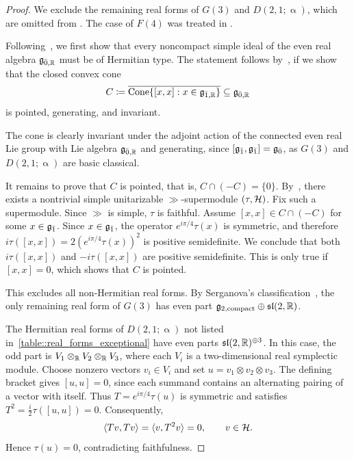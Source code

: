 \begin{proof}
We exclude the remaining real forms of $G(3)$ and
$D(2,1;\upalpha)$, which are omitted from
\cite[Theorem~6.2.1]{neeb2011lie}.
The case of $F(4)$ was treated in
\cite{Schmidt_unitary_branching}.

Following~\cite{neeb2011lie}, we first show that every noncompact
simple ideal of the even real algebra ${\mathfrak{g}}_{\bar{0},{\mathbb R}}$ must be of
Hermitian type. The statement follows by~\cite[Sections~5.3 and~6.1]{neeb2011lie}, if we show that the closed convex cone
\begin{equation*}
C\coloneqq\overline{\operatorname{Cone}\{[x,x]:x\in{\mathfrak{g}}_{\bar1,{\mathbb R}}\}}\subseteq{\mathfrak{g}}_{\bar0,{\mathbb R}}
\end{equation*}
is pointed, generating, and invariant. 

The cone is clearly invariant under the adjoint action of the connected even real Lie group with Lie algebra ${\mathfrak{g}}_{\bar0,{\mathbb R}}$ and generating, since $[{\mathfrak{g}_{\bar{1}}},{\mathfrak{g}_{\bar{1}}}]={\mathfrak{g}_{\bar{0}}}$, as $G(3)$ and $D(2,1;\upalpha)$ are basic classical.

It remains to prove that $C$ is pointed, that is, $C\cap(-C)=\{0\}$. By~\cite{jakobsen1994full}, there exists a nontrivial simple unitarizable $\gg$-supermodule $(\tau,{\mathcal{H}})$. Fix such a supermodule. Since $\gg$ is simple, $\tau$ is faithful. Assume $[x,x] \in C\cap (-C)$ for some $x \in {\mathfrak{g}_{\bar{1}}}$. Since $x \in {\mathfrak{g}_{\bar{1}}}$, the operator $e^{i\pi/4}\tau(x)$ is symmetric, and therefore $i\tau([x,x])=2(e^{i\pi/4}\tau(x))^2$ is positive semidefinite. We conclude that both $i\tau([x,x])$ and $-i\tau([x,x])$ are positive semidefinite. This is only true if $[x,x]=0$, which shows that $C$ is pointed.

This excludes all non-Hermitian real forms. By Serganova's classification~\cite{serganova1983classification}, the only remaining real form of $G(3)$ has even part $\mathfrak{g}_{2,\mathrm{compact}}\oplus{\mathfrak{sl}}(2,{\mathbb R})$. 

The Hermitian real forms of $D(2,1;\upalpha)$ not listed in~\eqref{table::real_forms_exceptional} have even parts ${\mathfrak{sl}}(2,{\mathbb R})^{\oplus3}$. In this case, the odd part is $V_1\otimes_{{\mathbb R}}V_2\otimes_{{\mathbb R}}V_3$, where each $V_i$ is a two-dimensional real symplectic module. Choose nonzero vectors $v_i\in V_i$ and set $u=v_1\otimes v_2\otimes v_3$. The defining bracket gives $[u,u]=0$, since each summand contains an alternating pairing of a vector with itself. Thus $T=e^{i\pi/4}\tau(u)$ is symmetric and satisfies $T^2=\frac{i}{2}\tau([u,u])=0$. Consequently,
\begin{equation*}
\langle Tv,Tv\rangle=\langle v,T^2v\rangle=0,
\qquad v\in{\mathcal{H}}.
\end{equation*}
Hence $\tau(u)=0$, contradicting faithfulness. 
\end{proof}

